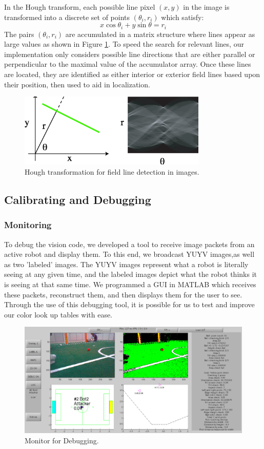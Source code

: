 \documentclass{article}
\begin{document}
  In the Hough transform, each possible line pixel \((x, y)\) in the image is transformed into a discrete set of points \((\theta_{i},r_{i})\) which satisfy:
  \begin{equation}
	  x \cos \theta_{i} + y \sin \theta = r_{i} 
  \end{equation}
  The pairs \((\theta_{i},r_{i})\) are accumulated in a matrix structure where lines appear as large values as shown in Figure \ref{fig:Hough}. To speed the search for relevant lines, our implementation only considers possible line directions that are either parallel or perpendicular to the maximal value of the accumulator array. Once these lines are located, they are identified as either interior or exterior field lines based upon their position, then used to aid in localization.
  \begin{figure}[H]
	  \centering
	  \includegraphics[width=0.8\textwidth]{figures/Hough.eps}
 		\caption{Hough transformation for field line detection in images.}
  	\label{fig:Hough}
  \end{figure}

  
  \subsection{Calibrating and Debugging}
    \subsubsection{Monitoring}    
      To debug the vision code, we developed a tool to receive image packets from an active robot and display them. To this end, we broadcast YUYV images,as well as two ’labeled’ images. The YUYV images represent what a robot is literally seeing at any given time, and the labeled images depict what the robot thinks it is seeing at that same time. We programmed a GUI in MATLAB which receives these packets, reconstruct them, and then displays them for the user to see. Through the use of this debugging tool, it is possible for us to test and improve our color look up tables with ease.
      \begin{figure}[H]
		    \centering
    		\includegraphics[width=.8\textwidth]{figures/monitor.eps}
		    \caption{Monitor for Debugging.}
    		\label{fig:monitor}
	    \end{figure}
 
\end{document}
